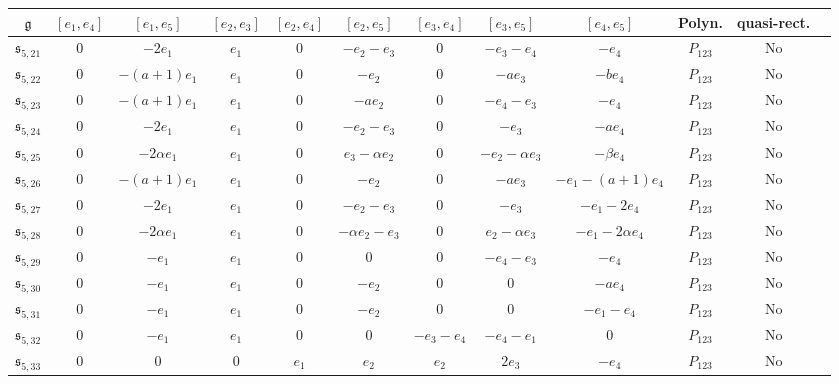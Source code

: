 \documentclass[12pt]{article}
\theoremstyle{plain}
\theoremstyle{definition}
\numberwithin{equation}{section}
\begin{document}
\begin{landscape}
{\tiny 
\begin{table}[ht]
    \centering
  {\small  \begin{tabular}{|c|c|c|c|c|c|c|c|c|c|c|c|}
         \hline
      $\mathfrak{g}$&  $[e_1,e_4]$ & $[e_1,e_5]$ & $[e_2,e_3]$&$[e_2,e_4]$&$[e_2,e_5]$&$[e_3,e_4]$&$[e_3,e_5]$& $[e_4,e_5]$&Polyn. & quasi-rect. \\\hline
             $\mathfrak{s}_{5,21} $ &  $0$ & $-2e_1$ &$e_1$&$0$&$-e_2-e_3$&$0$&$-e_3-e_4$&$-e_4$&$P_{123}$& No\\\hline
             $\mathfrak{s}_{5,22} $ &  $0$ & $-(a+1)e_1$ &$e_1$&$0$&$-e_2$&$0$&$-ae_3$&$-b e_4$&$P_{123}$& No\\\hline
             $\mathfrak{s}_{5,23} $ &  $0$ & $-(a+1)e_1$ &$e_1$&$0$&$-ae_2$&$0$&$-e_4-e_3$&$-e_4$&$P_{123}$& No\\\hline
             $\mathfrak{s}_{5,24} $ &  $0$ & $-2e_1$ &$e_1$&$0$&$-e_2-e_3$&$0$&$-e_3$&$-a e_4$&$P_{123}$& No\\\hline
             $\mathfrak{s}_{5,25} $ &  $0$ & $-2\alpha e_1$ &$e_1$&$0$&$e_3-\alpha e_2$&$0$&$-e_2-\alpha e_3$&$-\beta e_4$&$P_{123}$& No\\\hline
             $\mathfrak{s}_{5,26} $ &  $0$ & $-(a+1)e_1$ &$e_1$&$0$&$-e_2$&$0$&$-ae_3$&$-e_1-(a+1)e_4$&$P_{123}$& No\\\hline
             $\mathfrak{s}_{5,27} $ & $0$ & $-2e_1$ &$e_1$&$0$&$-e_2-e_3$&$0$&$-e_3$&$-e_1-2e_4$&$P_{123}$& No\\\hline
             $\mathfrak{s}_{5,28} $ & $0$ & $-2\alpha e_1$ &$e_1$&$0$&$-\alpha e_2-e_3$&$0$&$e_2-\alpha e_3$&$-e_1-2\alpha e_4$&$P_{123}$& No\\\hline
             $\mathfrak{s}_{5,29} $ &  $0$ & $-e_1$ &$e_1$&$0$&$0$&$0$&$-e_4-e_3$&$-e_4$&$P_{123}$& No\\\hline     
             $\mathfrak{s}_{5,30} $ & $0$ & $-e_1$ &$e_1$&$0$&$-e_2$&$0$&$0$&$-ae_4$&$P_{123}$& No\\\hline
             $\mathfrak{s}_{5,31} $ & $0$ & $-e_1$ &$e_1$&$0$&$-e_2$&$0$&$0$&$-e_1-e_4$&$P_{123}$& No\\\hline
             $\mathfrak{s}_{5,32} $ &$0$ &$-e_1$ &$e_1$&$0$&$0$&$-e_3-e_4$&$-e_4-e_1$&$0$&$P_{123}$& No\\\hline
             $\mathfrak{s}_{5,33} $ &  $0$ & $0$ &$0$&$e_1$&$e_2$&$e_2$&$2e_3$&$-e_4$&$P_{123}$& No\\\hline

\end{tabular}}
\end{table}}
\end{landscape}
\end{document}
